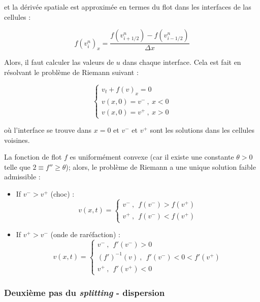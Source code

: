 \noindent et la dérivée spatiale est approximée en termes du flot dans les interfaces de las cellules :

\begin{equation*}
f(v_i^n)_x = \frac{f\left(v_{i+1/2}^n\right) - f\left(v_{i-1/2}^n\right)}{\Delta x}
\end{equation*}

\indent Alors, il faut calculer las valeurs de $u$ dans chaque interface. Cela est fait en résolvant le problème de Riemann suivant :

\begin{equation*}
\begin{cases}
v_t + f(v)_x = 0 \\
v(x,0) = v^- \ , \ x < 0 \\
v(x,0) = v^+ \ , \ x > 0
\end{cases}
\end{equation*}

\noindent où l'interface se trouve dans $x=0$ et $v^-$ et $v^+$ sont les solutions dans les cellules voisines.

\indent La fonction de flot $f$ es uniformément convexe (car il existe une constante $\theta > 0$ telle que $2 \equiv f'' \geq \theta$); alors, le problème de Riemann a une unique solution faible admissible  \cite{conservationLaws2002} :

\begin{itemize}
\item  If $v^- > v^+$  (choc) : 
\begin{equation*}
v(x,t) = 
\begin{cases}
v^- \ ,\ \   f(v^-) > f(v^+) \\
v^+ \ ,\ \ f(v^-) < f(v^+)
\end{cases}
\end{equation*}

\item If $v^+ > v^-$  (onde de raréfaction) :
\begin{equation*}
v(x,t) = 
\begin{cases}
v^- \ ,\ \ f'(v^-) > 0 \\
\left(f'\right)^{-1}(v) \ ,\ \ f'(v^-) < 0 < f'(v^+) \\
v^+ \ ,\ \ f'(v^+) < 0 
\end{cases}
\end{equation*}
\end{itemize}


\subsubsection{Deuxième pas du \emph{splitting} - dispersion}

